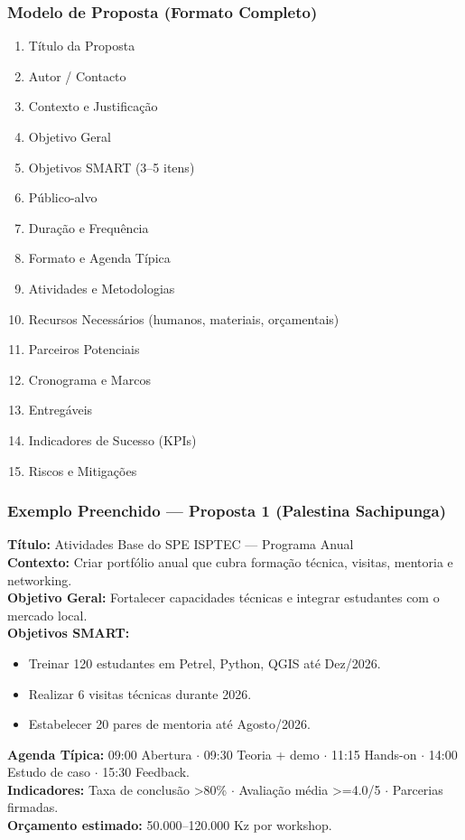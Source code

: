 \documentclass[12pt,a4paper]{article}
\begin{document}
\subsubsection*{Modelo de Proposta (Formato Completo)}
\begin{enumerate}
    \item Título da Proposta
    \item Autor / Contacto
    \item Contexto e Justificação
    \item Objetivo Geral
    \item Objetivos SMART (3–5 itens)
    \item Público-alvo
    \item Duração e Frequência
    \item Formato e Agenda Típica
    \item Atividades e Metodologias
    \item Recursos Necessários (humanos, materiais, orçamentais)
    \item Parceiros Potenciais
    \item Cronograma e Marcos
    \item Entregáveis
    \item Indicadores de Sucesso (KPIs)
    \item Riscos e Mitigações
\end{enumerate}

\subsubsection*{Exemplo Preenchido — Proposta 1 (Palestina Sachipunga)}

\begin{goldbox}
\small
\textbf{Título:} Atividades Base do SPE ISPTEC — Programa Anual\\[3pt]
\textbf{Contexto:} Criar portfólio anual que cubra formação técnica, visitas, mentoria e networking.\\[3pt]
\textbf{Objetivo Geral:} Fortalecer capacidades técnicas e integrar estudantes com o mercado local.\\[3pt]
\textbf{Objetivos SMART:}
\begin{itemize}[topsep=2pt, itemsep=2pt]
    \item Treinar 120 estudantes em Petrel, Python, QGIS até Dez/2026.
    \item Realizar 6 visitas técnicas durante 2026.
    \item Estabelecer 20 pares de mentoria até Agosto/2026.
\end{itemize}
\textbf{Agenda Típica:} 09:00 Abertura $\cdot$ 09:30 Teoria + demo $\cdot$ 11:15 Hands-on $\cdot$ 14:00 Estudo de caso $\cdot$ 15:30 Feedback.\\[3pt]
\textbf{Indicadores:} Taxa de conclusão >80\% $\cdot$ Avaliação média >=4.0/5 $\cdot$ Parcerias firmadas.\\[3pt]
\textbf{Orçamento estimado:} 50.000–120.000 Kz por workshop.
\end{goldbox}
\end{document}
